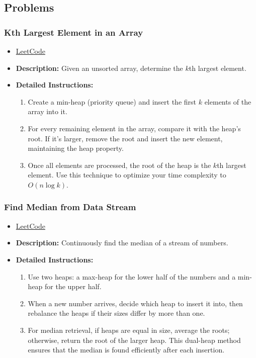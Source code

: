 \subsection{Problems}

\subsubsection{Kth Largest Element in an Array}
\begin{itemize}
    \item \href{https://leetcode.com/problems/kth-largest-element-in-an-array/}{LeetCode}
    \item \textbf{Description:} Given an unsorted array, determine the $k$th largest element.
    \item \textbf{Detailed Instructions:}
    \begin{enumerate}
        \item Create a min-heap (priority queue) and insert the first $k$ elements of the array into it.
        \item For every remaining element in the array, compare it with the heap’s root. If it’s larger, remove the root and insert the new element, maintaining the heap property.
        \item Once all elements are processed, the root of the heap is the $k$th largest element. Use this technique to optimize your time complexity to $O(n \log k)$.
    \end{enumerate}
\end{itemize}

\subsubsection{Find Median from Data Stream}
\begin{itemize}
    \item \href{https://leetcode.com/problems/find-median-from-data-stream/}{LeetCode}
    \item \textbf{Description:} Continuously find the median of a stream of numbers.
    \item \textbf{Detailed Instructions:}
    \begin{enumerate}
        \item Use two heaps: a max-heap for the lower half of the numbers and a min-heap for the upper half.
        \item When a new number arrives, decide which heap to insert it into, then rebalance the heaps if their sizes differ by more than one.
        \item For median retrieval, if heaps are equal in size, average the roots; otherwise, return the root of the larger heap. This dual-heap method ensures that the median is found efficiently after each insertion.
    \end{enumerate}
\end{itemize}

